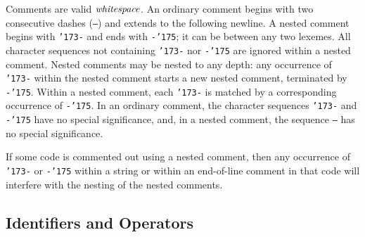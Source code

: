 Comments are valid \mbox{$\it whitespace$}.  An ordinary
comment begins with two consecutive
dashes (\mbox{\tt --}) and extends to the following newline.
A nested
comment begins with \mbox{\tt {\char'173}-} and ends with
\mbox{\tt -{\char'175}}; it can be between any two lexemes.
All character sequences not containing \mbox{\tt {\char'173}-} nor \mbox{\tt -{\char'175}}
are ignored within a nested comment.
Nested comments may be
nested to any depth: any occurrence of \mbox{\tt {\char'173}-} within the nested
comment starts a new nested comment, terminated by \mbox{\tt -{\char'175}}.  Within
a nested comment, each \mbox{\tt {\char'173}-} is matched by a corresponding
occurrence of \mbox{\tt -{\char'175}}.  In an ordinary comment, the character
sequences \mbox{\tt {\char'173}-} and \mbox{\tt -{\char'175}} have no special significance, and, in a
nested comment, the sequence \mbox{\tt --} has no special significance.

If some code is commented out using a nested comment, then any
occurrence of \mbox{\tt {\char'173}-} or \mbox{\tt -{\char'175}} within a string or within an end-of-line
comment in that code will interfere with the nesting of the nested
comments.

\subsection{Identifiers and Operators}
\label{ids}

